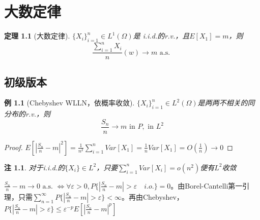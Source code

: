 \documentclass{ctexart}
\begin{document}
\newcommand{\R}{\mathbb{R}}
\newcommand{\N}{\mathbb{N}}
\newcommand{\dd}{\,\mathrm{d}}
\newcommand{\st}{\text{ s.t. }}
\newcommand{\pp}[2]{\frac{\partial #1}{\partial #2}}
\newcommand{\dif}[2]{\frac{\mathrm{d}#1}{\mathrm{d}#2}}
\newcommand{\nm}[1]{\left\|#1\right\|}
\newcommand{\dual}[1]{\left<#1\right>}
\newcommand{\wto}{\rightharpoonup}
\newcommand{\wsto}{\stackrel{*}{\rightharpoonup}}
\newcommand{\cvin}{\text{ in }}
\newcommand{\alev}{\text{ a.e. }}
\newcommand{\alsu}{\text{ a.s. }}
\newcommand{\E}{\mathcal{E}}
\newcommand{\F}{\mathscr{F}}
\newcommand{\G}{\mathscr{G}}
\newcommand{\Bor}{\mathscr{B}}
\newcommand{\pw}{\text{ p.w. }}
\newcommand{\inof}{\text{ i.o. }}
\newcommand{\X}{\bm{X}}
\newcommand{\iid}{\mathrm{i.i.d.}~}
\newcommand{\C}{\mathbb{C}}


\newtheorem{Thm}{定理}[section]
\newtheorem{Lemma}[Thm]{引理}
\newtheorem{Prop}[Thm]{命题}
\newtheorem{Cor}[Thm]{推论}
\newtheorem{Def}{定义}[section]
\newtheorem{Rmk}{注}[section]
\newtheorem{Eg}{例}[section]
\else
\chapter{大数定律}
\fi
\begin{Thm}[大数定律]
$\{X_{i}\}_{i=1}^{n}\in L^{1}(\Omega)$是 i.i.d.的r.v.，且$E[X_{1}]=m$，则
\[\frac{\sum_{i=1}^{n}X_{i}}{n}(w)\to m\alsu\]
\end{Thm}
\section{初级版本}
\begin{Eg}[Chebyshev WLLN，依概率收敛]
  $\{X_{i}\}_{i=1}^{n}\in L^{2}(\Omega)$是两两不相关的同分布的r.v.，则
  \[\frac{S_{n}}{n}\to m\cvin P,\cvin L^{2}\]
\end{Eg}

\begin{proof}
  $E[|\frac{S_{n}}{n}-m|^{2}]=\frac{1}{n^{2}}\sum_{i=1}^{n}Var[X_{1}]=\frac{1}{n}Var[X_{1}]=O(\frac{1}{n})\to 0$
\end{proof}

\begin{Rmk}
  对于i.i.d.的$\{X_{i}\}\in L^{2}$，只要$\sum_{i=1}^{n}Var[X_{i}]=o(n^{2})$便有$L^{2}$收敛
\end{Rmk}

$\frac{S_{n}}{n}-m\to 0\alsu\Leftrightarrow \forall\varepsilon>0, P\{|\frac{S_{n}}{n}-m|>\varepsilon\quad i.o.\}=0$。由Borel-Cantelli第一引理，只需$\sum_{n=1}^{\infty}P\{|\frac{S_{n}}{n}-m|>\varepsilon\}<\infty$。再由Chebyshev，$P\{|\frac{S_{n}}{n}-m|>\varepsilon\}\leq\varepsilon^{-p}E[|\frac{S_{n}}{n}-m|^{p}]$
\end{document}

